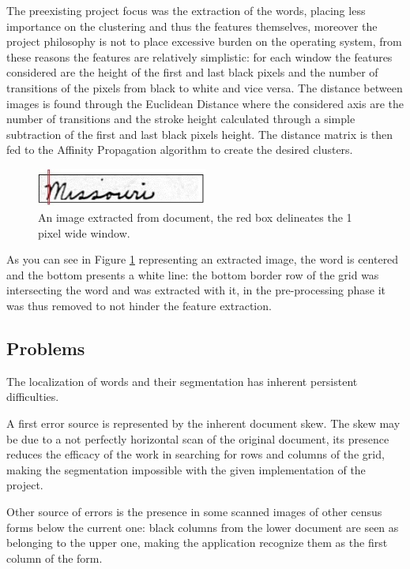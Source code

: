 The preexisting project focus was the extraction of the words, placing less importance on the clustering and thus the features themselves, moreover the project philosophy is not to place excessive burden on the operating system, from these reasons  the features are relatively simplistic: for each window the features considered are the height of the first and last black pixels and the number of transitions of the pixels from black to white and vice versa.
The distance between images is found through the Euclidean Distance where the considered axis are the number of transitions and the stroke height calculated through a simple subtraction of the first and last black pixels height.
The distance matrix is then fed to the Affinity Propagation algorithm to create the desired clusters.

\begin{figure}[!ht]
\centering
\vspace{0.3cm}
\includegraphics[width=0.5\textwidth]{images/missouri_1pix.jpg}
\caption{An image extracted from document, the red box delineates the 1 pixel wide window.}
\label{fig:extracted_image}
\end{figure}

As you can see in Figure \ref{fig:extracted_image} representing an extracted image, the word is centered and the bottom presents a white line: the bottom border row of the grid was intersecting the word and was extracted with it, in the pre-processing phase it was thus removed to not hinder the feature extraction.

\subsection{Problems}

The localization of words and their segmentation has inherent persistent difficulties.

A first error source is represented by the inherent document skew. The skew may be due to a not perfectly horizontal scan of the original document, its presence reduces the efficacy of the work in searching for rows and columns of the grid, making the segmentation impossible with the given implementation of the project.

Other source of errors is the presence in some scanned images of other census forms below the current one: black columns from the lower document are seen as belonging to the upper one, making the application recognize them as the first column of the form.


